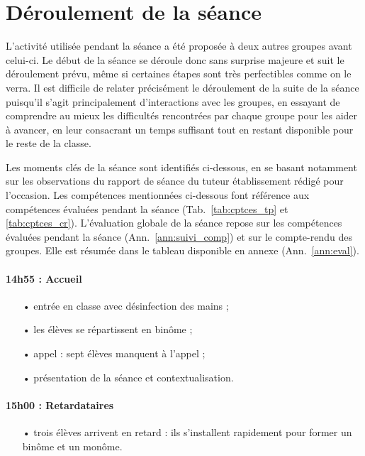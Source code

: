 \documentclass[12pt,a4paper, fleqn]{report}
\begin{document}
\section{Déroulement de la séance}
\label{sec:deroullement}

L'activité utilisée pendant la séance a été proposée à deux autres groupes avant celui-ci.
Le début de la séance se déroule donc sans surprise majeure et suit le déroulement prévu, même si certaines étapes sont très perfectibles comme on le verra.
Il est difficile de relater précisément le déroulement de la suite de la séance puisqu'il s'agit principalement  d'interactions avec les groupes, en essayant de comprendre au mieux les difficultés rencontrées par chaque groupe pour les aider à avancer, en leur consacrant un temps suffisant tout en restant disponible pour le reste de la classe.

Les moments clés de la séance sont identifiés ci-dessous, en se basant notamment sur les observations du rapport de séance du tuteur établissement rédigé pour l'occasion.
Les compétences mentionnées ci-dessous font référence aux compétences évaluées pendant la séance (Tab.~\ref{tab:cptces_tp} et \ref{tab:cptces_cr}).
L'évaluation globale de la séance repose sur les compétences évaluées pendant la séance (Ann.~\ref{ann:suivi_comp}) et sur le compte-rendu des groupes.
Elle est résumée dans le tableau disponible en annexe (Ann.~\ref{ann:eval}).

\paragraph{14h55 : Accueil}
\begin{itemize}
\item[•] entrée en classe avec désinfection des mains ;
\item[•] les élèves se répartissent en binôme ;
\item[•] appel : sept élèves manquent à l'appel ;
\item[•] présentation de la séance et contextualisation.
\end{itemize}

\paragraph{15h00 : Retardataires}
\begin{itemize}
\item[•] trois élèves arrivent en retard : ils s'installent rapidement pour former un binôme et un monôme.
\end{itemize}
\end{document}

